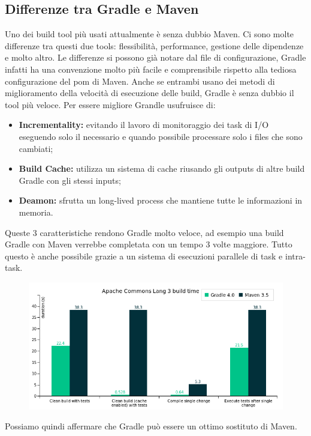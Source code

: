 \subsection{Differenze tra Gradle e Maven}
Uno dei build tool più usati attualmente è senza dubbio Maven. Ci sono molte differenze tra questi due tools: flessibilità, performance, gestione delle dipendenze e molto altro. Le differenze si possono già notare dal file di configurazione, Gradle infatti ha una convenzione molto più facile e comprensibile rispetto alla tediosa configurazione del pom di Maven. Anche se entrambi usano dei metodi di miglioramento della velocità di esecuzione delle build, Gradle è senza dubbio il tool più veloce. Per essere migliore Grandle usufruisce di:
\begin{itemize}
    \item \textbf{Incrementality:} evitando il lavoro di monitoraggio dei task di I/O eseguendo solo il necessario e quando possibile processare solo i files che sono cambiati;
    \item \textbf{Build Cache:} utilizza un sistema di cache riusando gli outputs di altre build Gradle con gli stessi inputs;
    \item \textbf{Deamon:} sfrutta un long-lived process che mantiene tutte le informazioni in memoria.
\end{itemize}
Queste 3 caratteristiche rendono Gradle molto veloce, ad esempio una build Gradle con Maven verrebbe completata con un tempo 3 volte maggiore. Tutto questo è anche possibile grazie a un sistema di esecuzioni parallele di task e intra-task.
\begin{figure}[H]
\centering
\includegraphics[width=0.7\linewidth]{0introduction/gradle/performance.png}
\end{figure}
Possiamo quindi affermare che Gradle può essere un ottimo sostituto di Maven.